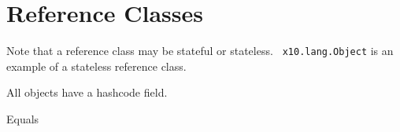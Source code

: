 \section{Reference Classes}

Note that a reference class may be stateful or stateless. {\tt
x10.lang.Object} is an example of a stateless reference class.

All objects have a hashcode field.

Equals